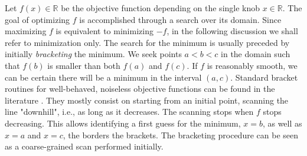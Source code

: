 
Let $f(x)\in\mathbb{R}$ be the objective function depending on the single knob $x\in\mathbb{R}$. The goal of optimizing $f$ is accomplished through a search over its domain. Since maximizing $f$ is equivalent to minimizing $-f$, in the following discussion we shall refer to minimization only. The search for the minimum is usually preceded by initially \textit{bracketing} the minimum. We seek points $a < b < c$ in the domain such that $f(b)$ is smaller than both $f(a)$ and $f(c)$. If $f$ is reasonably smooth, we can be certain there will be a minimum in the interval $(a, c)$. Standard bracket routines for well-behaved, noiseless objective functions can be found in the literature \cite[section 10.1]{press_numerical_2007}. They mostly consist on starting from an initial point, scanning the line "downhill", i.e., as long as it decreases. The scanning stops when $f$ stops decreasing. This allows identifying a first guess for the minimum, $x=b$, as well as $x=a$ and $x=c$, the borders the brackets. The bracketing procedure can be seen as a coarse-grained scan performed initially.

